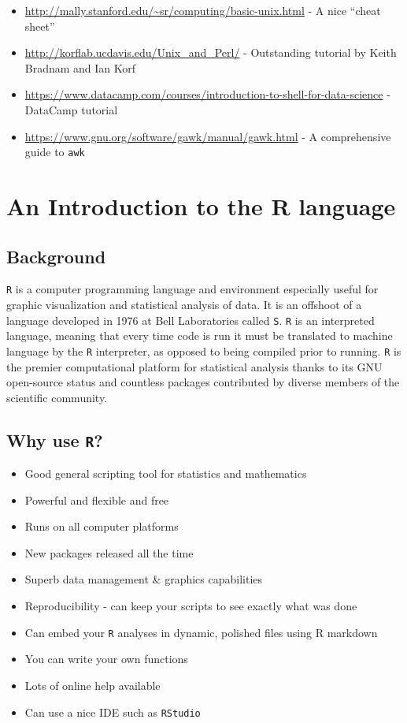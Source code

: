 \documentclass[]{book}
\providecommand{\tightlist}{%
  \setlength{\itemsep}{0pt}\setlength{\parskip}{0pt}}
\begin{document}
\begin{itemize}
\item
  \url{http://mally.stanford.edu/~sr/computing/basic-unix.html} - A nice ``cheat sheet''
\item
  \url{http://korflab.ucdavis.edu/Unix_and_Perl/} - Outstanding tutorial by Keith Bradnam and Ian Korf
\item
  \url{https://www.datacamp.com/courses/introduction-to-shell-for-data-science} - DataCamp tutorial
\item
  \url{https://www.gnu.org/software/gawk/manual/gawk.html} - A comprehensive guide to \texttt{awk}
\end{itemize}

\hypertarget{an-introduction-to-the-r-language}{%
\chapter{An Introduction to the R language}\label{an-introduction-to-the-r-language}}

\hypertarget{background}{%
\section{Background}\label{background}}

\texttt{R} is a computer programming language and environment especially useful for graphic visualization and statistical analysis of data. It is an offshoot of a language developed in 1976 at Bell Laboratories called \texttt{S}. \texttt{R} is an interpreted language, meaning that every time code is run it must be translated to machine language by the \texttt{R} interpreter, as opposed to being compiled prior to running. \texttt{R} is the premier computational platform for statistical analysis thanks to its GNU open-source status and countless packages contributed by diverse members of the scientific community.

\hypertarget{why-use-r}{%
\section{\texorpdfstring{Why use \texttt{R}?}{Why use R?}}\label{why-use-r}}

\begin{itemize}
\tightlist
\item
  Good general scripting tool for statistics and mathematics
\item
  Powerful and flexible and free
\item
  Runs on all computer platforms
\item
  New packages released all the time
\item
  Superb data management \& graphics capabilities
\item
  Reproducibility - can keep your scripts to see exactly what was done
\item
  Can embed your \texttt{R} analyses in dynamic, polished files using R markdown
\item
  You can write your own functions
\item
  Lots of online help available
\item
  Can use a nice IDE such as \texttt{RStudio}
\end{itemize}
\end{document}
